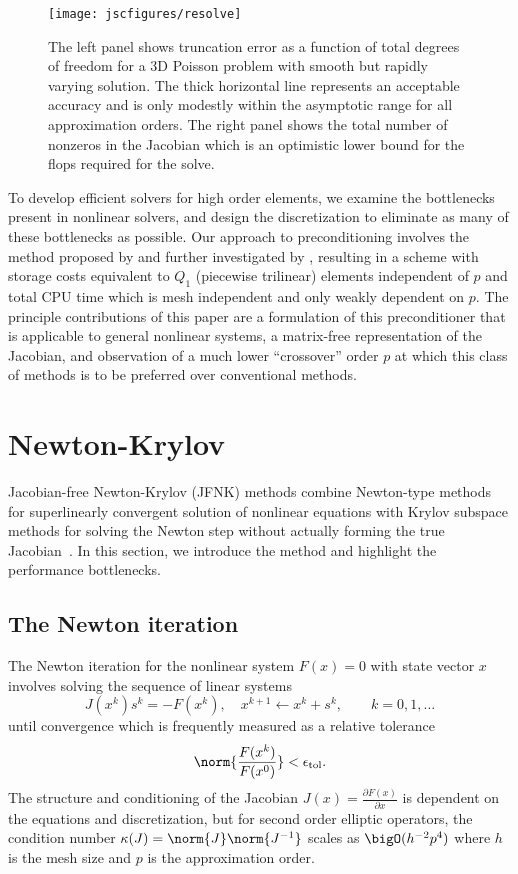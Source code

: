 \begin{figure}
  \centering\texttt{[image: jscfigures/resolve]}
  \caption{The left panel shows truncation error as a function of total degrees of freedom for a 3D Poisson problem with
    smooth but rapidly varying solution.  The thick horizontal line represents an acceptable accuracy and is only
    modestly within the asymptotic range for all approximation orders.  The right panel shows the total number of
    nonzeros in the Jacobian which is an optimistic lower bound for the flops required for the solve.}
  \label{fig:resolve}
\end{figure}

To develop efficient solvers for high order elements, we examine the bottlenecks present in nonlinear solvers, and
design the discretization to eliminate as many of these bottlenecks as possible.  Our approach to preconditioning
involves the method proposed by \cite{orszag1980smp} and further investigated by
\cite{deville1985cps,deville1990fep,heys2005amh,kim2007pbp}, resulting in a scheme with storage costs equivalent to
$Q_1$ (piecewise trilinear) elements independent of $p$ and total CPU time which is mesh independent and only weakly
dependent on $p$.  The principle contributions of this paper are a formulation of this preconditioner that is applicable
to general nonlinear systems, a matrix-free representation of the Jacobian, and observation of a much lower
``crossover'' order $p$ at which this class of methods is to be preferred over conventional methods.

\section{Newton-Krylov}\label{sec:jfnk}
Jacobian-free Newton-Krylov (JFNK) methods combine Newton-type methods for superlinearly convergent solution of
nonlinear equations with Krylov subspace methods for solving the Newton step without actually forming the true
Jacobian~\cite{knoll2004jfn}.  In this section, we introduce the method and highlight the performance bottlenecks.
\subsection{The Newton iteration}
The Newton iteration for the nonlinear system $F(x) = 0$ with state vector $x$ involves solving the sequence of linear
systems
\begin{equation}
  J(x^{k}) s^k = - F(x^k), \quad x^{k+1} \gets x^k + s^k, \qquad k=0,1,\dotsc\label{eq:newton}
\end{equation}
until convergence which is frequently measured as a relative tolerance
\begin{equation*}
 \norm{\frac{F(x^k)}{F(x^0)}} < \epsilon_{\mathrm{tol}} .
\end{equation*}
The structure and conditioning of the Jacobian $J(x) = \frac{\partial F(x)}{\partial x}$ is dependent on the equations
and discretization, but for second order elliptic operators, the condition number $\kappa(J) = \norm{J}\norm{J^{-1}}$
scales as $\bigO(h^{-2} p^4)$ where $h$ is the mesh size and $p$ is the approximation order.

